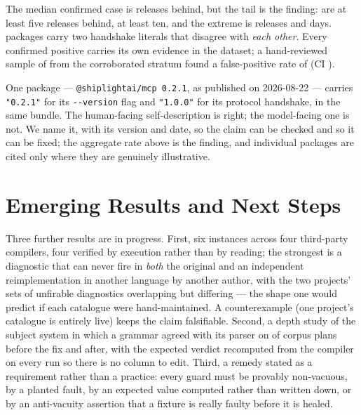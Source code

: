\documentclass[10pt,conference]{IEEEtran}
\begin{document}
The median confirmed case is \factEcoMedianReleases{} releases behind, but the tail is the
finding: \factEcoGeFive{} are at least five releases behind, \factEcoGeTen{} at least ten,
and the extreme is \factEcoMaxReleases{} releases and \factEcoMaxDays{} days.
\factEcoInternalDisagreement{} packages carry two handshake literals that disagree with
\emph{each other}. Every confirmed positive carries its own evidence in the dataset; a
hand-reviewed sample of \factEcoFpReviewed{} from the corroborated stratum found a
false-positive rate of \factEcoFpRate{} (CI \factEcoFpRateCI{}).

One package --- \texttt{@shiplightai/mcp\,0.2.1}, as published on
2026-08-22 --- carries \texttt{"0.2.1"} for its \texttt{-{}-version} flag and
\texttt{"1.0.0"} for its protocol handshake, in the same bundle. The human-facing
self-description is right; the model-facing one is not. We name it, with its version and
date, so the claim can be checked and so it can be fixed; the aggregate rate above is the
finding, and individual packages are cited only where they are genuinely illustrative.


\section{Emerging Results and Next Steps}

Three further results are in progress. First, six instances across four third-party
compilers, four verified by execution rather than by reading; the strongest is a
diagnostic that can never fire in \emph{both} the original and an independent
reimplementation in another language by another author, with the two projects' sets of
unfirable diagnostics overlapping but differing --- the shape one would predict if each
catalogue were hand-maintained. A counterexample (one project's catalogue is entirely
live) keeps the claim falsifiable. Second, a depth study of the subject system in which a
grammar agreed with its parser on \factGbnfAgreeBefore{} of \factGbnfCorpus{} corpus
plans before the fix and \factGbnfAgreeNow{} after, with the expected verdict recomputed
from the compiler on every run so there is no column to edit. Third, a remedy stated as a
requirement rather than a practice: every guard must be provably non-vacuous, by a planted
fault, by an expected value computed rather than written down, or by an anti-vacuity
assertion that a fixture is really faulty before it is healed.
\end{document}
